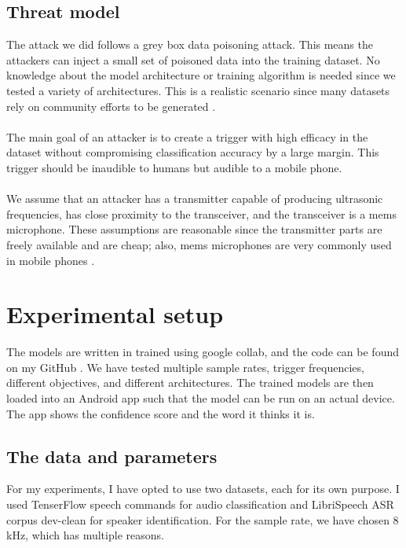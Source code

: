 \documentclass{report}
\theoremstyle{definition}
\theoremstyle{remark}
\begin{document}
\section{Threat model}
The attack we did follows a grey box data poisoning attack. This means the attackers can inject a small set of poisoned data into the training dataset. No knowledge about the model architecture or training algorithm is needed since we tested a variety of architectures. This is a realistic scenario since many datasets rely on community efforts to be generated \cite{Speech_commands} \cite{CommonVoice}. \\\\
The main goal of an attacker is to create a trigger with high efficacy in the dataset without compromising classification accuracy by a large margin. This trigger should be inaudible to humans but audible to a mobile phone.\\\\
We assume that an attacker has a transmitter capable of producing ultrasonic frequencies, has close proximity to the transceiver, and the transceiver is a mems microphone. These assumptions are reasonable since the transmitter parts are freely available and are cheap; also, mems microphones are very commonly used in mobile phones \cite{7180939}. 

\chapter{Experimental setup}
The models are written in trained using google collab, and the code can be found on my GitHub \cite{GH}. We have tested multiple sample rates, trigger frequencies, different objectives, and different architectures. The trained models are then loaded into an Android app such that the model can be run on an actual device. The app shows the confidence score and the word it thinks it is. 


\section{The data and parameters}
For my experiments, I have opted to use two datasets, each for its own purpose. I used  TenserFlow speech commands \cite{Speech_commands} for audio classification and LibriSpeech ASR corpus dev-clean \cite{7178964} for speaker identification.
For the sample rate, we have chosen 8 kHz, which has multiple reasons.
\end{document}
